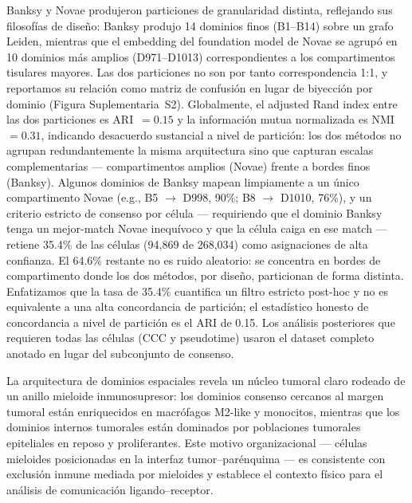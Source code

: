\documentclass[12pt,a4paper]{article}
\begin{document}
Banksy y Novae produjeron particiones de granularidad distinta, reflejando sus filosofías de diseño: Banksy produjo 14 dominios finos (B1--B14) sobre un grafo Leiden, mientras que el embedding del foundation model de Novae se agrupó en 10 dominios más amplios (D971--D1013) correspondientes a los compartimentos tisulares mayores. Las dos particiones no son por tanto correspondencia 1:1, y reportamos su relación como matriz de confusión en lugar de biyección por dominio (Figura Suplementaria~S2). Globalmente, el adjusted Rand index entre las dos particiones es ARI~$=0.15$ y la información mutua normalizada es NMI~$=0.31$, indicando desacuerdo sustancial a nivel de partición: los dos métodos no agrupan redundantemente la misma arquitectura sino que capturan escalas complementarias --- compartimentos amplios (Novae) frente a bordes finos (Banksy). Algunos dominios de Banksy mapean limpiamente a un único compartimento Novae (e.g., B5 $\to$ D998, 90\%; B8 $\to$ D1010, 76\%), y un criterio estricto de consenso por célula --- requiriendo que el dominio Banksy tenga un mejor-match Novae inequívoco y que la célula caiga en ese match --- retiene 35.4\% de las células (94,869 de 268,034) como asignaciones de alta confianza. El 64.6\% restante no es ruido aleatorio: se concentra en bordes de compartimento donde los dos métodos, por diseño, particionan de forma distinta. Enfatizamos que la tasa de 35.4\% cuantifica un filtro estricto post-hoc y no es equivalente a una alta concordancia de partición; el estadístico honesto de concordancia a nivel de partición es el ARI de 0.15. Los análisis posteriores que requieren todas las células (CCC y pseudotime) usaron el dataset completo anotado en lugar del subconjunto de consenso.

La arquitectura de dominios espaciales revela un núcleo tumoral claro rodeado de un anillo mieloide inmunosupresor: los dominios consenso cercanos al margen tumoral están enriquecidos en macrófagos M2-like y monocitos, mientras que los dominios internos tumorales están dominados por poblaciones tumorales epiteliales en reposo y proliferantes. Este motivo organizacional --- células mieloides posicionadas en la interfaz tumor--parénquima --- es consistente con exclusión inmune mediada por mieloides y establece el contexto físico para el análisis de comunicación ligando--receptor.
\end{document}
